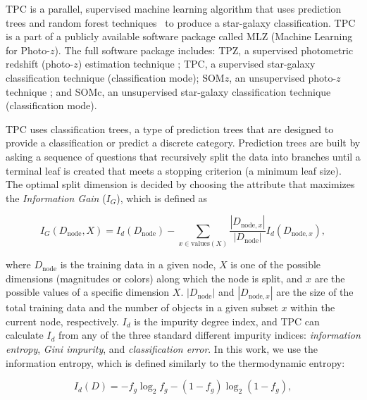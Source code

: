 TPC is a parallel, supervised machine learning algorithm
that uses prediction trees and random forest 
techniques~\citep{breiman1984classification, breiman2001random}
to produce a star-galaxy classification.
TPC is a part of a publicly available software package called \textsc{MLZ} (Machine Learning for Photo-$z$).
The full software package includes:
\textsc{TPZ}, a supervised photometric redshift (photo-$z$)
estimation technique
\citep[regression mode;][]{carrascokind2013tpz};
TPC, a supervised star-galaxy classification technique
(classification mode);
\textsc{SOM}$z$, an unsupervised photo-$z$ technique
\citep[regression mode;][]{carrascokind2014somz};
and
SOMc, an unsupervised star-galaxy classification technique
(classification mode).

TPC uses classification trees,
a type of prediction trees that are designed to
provide a classification or predict a discrete category.
Prediction trees are built by asking a sequence of questions
that recursively split the data into branches
until a terminal leaf is created
that meets a stopping criterion
(\eg a minimum leaf size).
The optimal split dimension is decided by
choosing the attribute that maximizes
the \textit{Information Gain} ($I_G$), which is defined as

\begin{equation} \label{eq:information_gain}
  I_G \left(D_{\mathrm{node}}, X\right)
  = I_d \left( D_{\mathrm{node}} \right)
  - \sum_{x \in \mathrm{values}(X)}
  \frac{|D_{\mathrm{node}, x}|}{|D_{\mathrm{node}}|}
  I_d \left( D_{\mathrm{node}, x} \right),
\end{equation}

\noindent
where $D_{\mathrm{node}}$ is the training data in a given node,
$X$ is one of the possible dimensions (\eg magnitudes or colors)
along which the node is split, and
$x$ are the possible values of a specific dimension $X$.
$|D_{\mathrm{node}}|$ and $|D_{\mathrm{node}, x}|$ are the size of the total training data
and the number of objects in a given subset $x$ within the current node,
respectively.
$I_d$ is the impurity degree index,
and TPC can calculate $I_d$
from any of the three standard different impurity indices:
\textit{information entropy}, \textit{Gini impurity},
and \textit{classification error}.
In this work, we use the information entropy,
which is defined similarly to the thermodynamic entropy:

\begin{equation}
  I_d \left( D \right)
  = - f_g \log_{2} f_g - \left(1 - f_g\right) \log_{2} \left(1 - f_g\right),
\end{equation}

